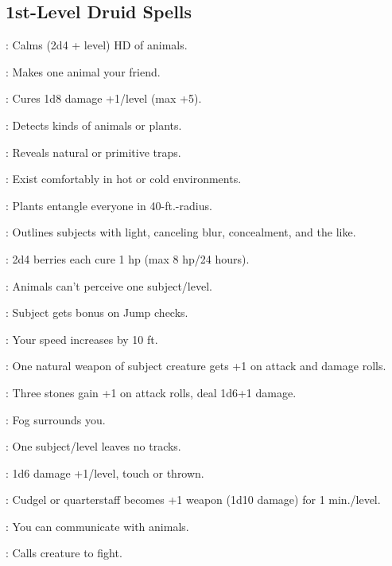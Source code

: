 \begin{multicols}{2}
\subsection{1st-Level Druid Spells}
\begin{description*}
\item[\linkspell{Calm Animals}:] Calms (2d4 + level) HD of animals.
\item[\linkspell{Charm Animal}:] Makes one animal your friend.
\item[\linkspell{Cure Light Wounds}:] Cures 1d8 damage +1/level (max +5).
\item[\linkspell{Detect Animals or Plants}:] Detects kinds of animals or plants.
\item[\linkspell{Detect Snares and Pits}:] Reveals natural or primitive traps.
\item[\linkspell{Endure Elements}:] Exist comfortably in hot or cold environments.
\item[\linkspell{Entangle}:] Plants entangle everyone in 40-ft.-radius.
\item[\linkspell{Faerie Fire}:] Outlines subjects with light, canceling blur, concealment, and the like.
\item[\linkspell{Goodberry}:] 2d4 berries each cure 1 hp (max 8 hp/24 hours).
\item[\linkspell{Hide from Animals}:] Animals can’t perceive one subject/level.
\item[\linkspell{Jump}:] Subject gets bonus on Jump checks.
\item[\linkspell{Longstrider}:] Your speed increases by 10 ft.
\item[\linkspell{Magic Fang}:] One natural weapon of subject creature gets +1 on attack and damage rolls.
\item[\linkspell{Magic Stone}:] Three stones gain +1 on attack rolls, deal 1d6+1 damage.
\item[\linkspell{Obscuring Mist}:] Fog surrounds you.
\item[\linkspell{Pass without Trace}:] One subject/level leaves no tracks.
\item[\linkspell{Produce Flame}:] 1d6 damage +1/level, touch or thrown.
\item[\linkspell{Shillelagh}:] Cudgel or quarterstaff becomes +1 weapon (1d10 damage) for 1 min./level.
\item[\linkspell{Speak with Animals}:] You can communicate with animals.
\item[\linkspell{Summon Nature’s Ally I}:] Calls creature to fight.
\end{description*}


\end{multicols}
